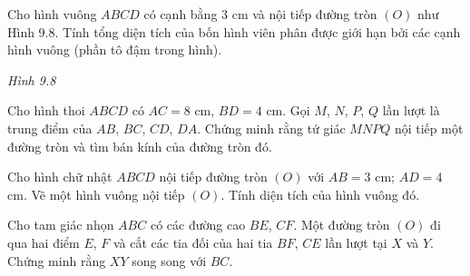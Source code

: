 \begin{practice}
\begin{questions}[resume=SBT]
        \item Cho hình vuông $ABCD$ có cạnh bằng 3 cm và nội tiếp đường tròn $(O)$ như Hình 9.8. Tính tổng diện tích của bốn hình viên phân được giới hạn bởi các cạnh hình vuông (phần tô đậm trong hình).

        \begin{center}

            \textit{Hình 9.8}
        \end{center}

        \answerline
        \answerline
        \answerline

        \item Cho hình thoi $ABCD$ có $AC=8$ cm, $BD=4$ cm. Gọi $M$, $N$, $P$, $Q$ lần lượt là trung điểm của $AB$, $BC$, $CD$, $DA$. Chứng minh rằng tứ giác $MNPQ$ nội tiếp một đường tròn và tìm bán kính của đường tròn đó.

        \answerline
        \answerline
        \answerline

        \item Cho hình chữ nhật $ABCD$ nội tiếp đường tròn $(O)$ với $AB=3$ cm; $AD=4$ cm. Vẽ một hình vuông nội tiếp $(O)$. Tính diện tích của hình vuông đó.

        \answerline
        \answerline
        \answerline

        \item Cho tam giác nhọn $ABC$ có các đường cao $BE$, $CF$. Một đường tròn $(O)$ đi qua hai điểm $E$, $F$ và cắt các tia đối của hai tia $BF$, $CE$ lần lượt tại $X$ và $Y$. Chứng minh rằng $XY$ song song với $BC$.

        \answerline
        \answerline
        \answerline
    \end{questions}
\end{practice}
